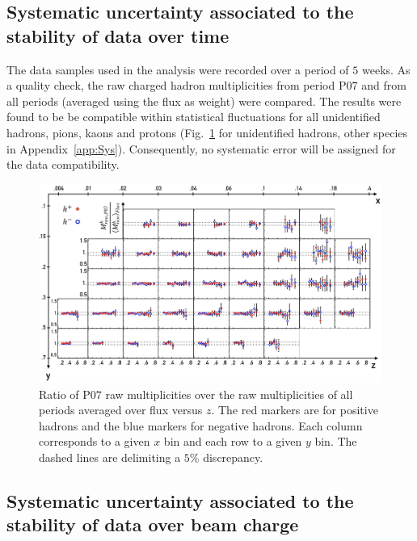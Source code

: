 
\subsection{Systematic uncertainty associated to the stability of data over time}

The data samples used in the analysis were recorded over a period of $5$ weeks. As a quality check, the raw charged hadron multiplicities from period P$07$ and from all periods (averaged using the flux as weight) were compared. The results were found to be be compatible within statistical fluctuations for all unidentified hadrons, pions, kaons and protons (Fig.~\ref{pic:hMultTime} for unidentified hadrons, other species in Appendix~\ref{app:Sys}). Consequently, no systematic error will be assigned for the data compatibility.

\begin{figure}
  \centering
	\includegraphics[scale=0.7]{./gfx/SysTimeMult.png}
	\caption{Ratio of P$07$ raw multiplicities over the raw multiplicities of all periods averaged over flux versus $z$. The red markers are for positive hadrons and the blue markers for negative hadrons. Each column corresponds to a given $x$ bin and each row to a given $y$ bin. The dashed lines are delimiting a $5$\% discrepancy.}
	\label{pic:hMultTime}
\end{figure}


\subsection{Systematic uncertainty associated to the stability of data over beam charge}

